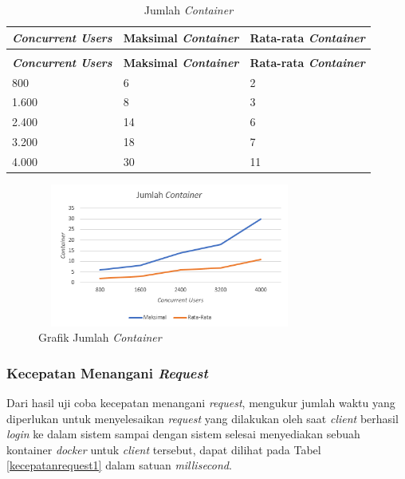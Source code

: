 \begin{longtable}{|p{}|p{}|p{}|}
	\caption{Jumlah \textit{Container}} \label{tjumlahcontainer} \\
	\hline
	\textbf{\textit{Concurrent Users}} & \textbf{Maksimal \textit{Container}} &  \textbf{Rata-rata \textit{Container}} \\ \hline
	\endfirsthead
	\caption[]{Jumlah \textit{Container}} \\
	\hline
	\textbf{\textit{Concurrent Users}} & \textbf{Maksimal \textit{Container}} &  \textbf{Rata-rata \textit{Container}} \\ \hline
	\endhead
	\endfoot
	\endlastfoot
	
	800 & 6 & 2 \\ \hline
	1.600 & 8 & 3 \\ \hline
	2.400 & 14 & 6 \\ \hline
	3.200 & 18 & 7 \\ \hline
	4.000 & 30 & 11 \\ \hline
	
\end{longtable}

\begin{figure}[H]
	\centering
	\includegraphics[width=8.7cm,height=4.7cm]{Images/C-5/jumlahcontainer.png}
	\caption{Grafik Jumlah \textit{Container}}
	\label{gjumlahcontainer}
\end{figure}

\subsubsection{Kecepatan Menangani \textit{Request}}
Dari hasil uji coba kecepatan menangani \textit{request}, mengukur jumlah waktu yang diperlukan untuk menyelesaikan \textit{request} yang dilakukan oleh saat \textit{client} berhasil \textit{login} ke dalam sistem sampai dengan sistem selesai menyediakan sebuah kontainer \textit{docker} untuk \textit{client} tersebut, dapat dilihat pada Tabel \ref{kecepatanrequest1} dalam satuan \textit{millisecond}.

